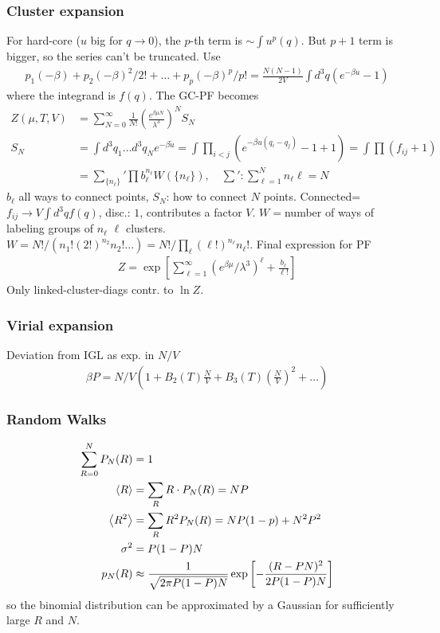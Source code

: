 \documentclass[a4paper, english, 12pt]{article}
\newcommand{\closed}[1]{\left( #1 \right)}
\newcommand{\bracket}[1]{\left[ #1 \right]}
\newcommand{\curly}[1]{\{ #1 \} }
\begin{document}
\begin{multicols*}{2}
\subsubsection*{\scriptsize Cluster expansion}
For hard-core ($u$ big for $q\to0$), the $p$-th term is $\sim \int u^p(q)$. But $p+1$ term is bigger, so the series can't be truncated. Use 
\begin{align*}
    p_1 (-\beta)  + p_2 (-\beta)^2 /2! + \dots + p_p (-\beta)^p /p! = \frac{N(N-1)}{2V} \int d^3 q (e^{-\beta u}-1)
\end{align*}
where the integrand is $f(q)$. The GC-PF becomes 
\begin{align*}
    Z(\mu,T,V) &= \sum_{N=0}^\infty \frac{1}{N!} \closed{\frac{e^{\beta\mu N}}{\lambda^3}}^N S_N \\ 
    S_N &=\int d^3 q_1 \dots d^3 q_N e^{-\beta \tilde{u}} = \int \prod_{i<j}\closed{e^{-\beta u(q_i-q_j)}-1+1} = \int \prod (f_{ij}+1) \\
    &= \sum_{\curly{n_\ell}}' \prod b_\ell^{n_\ell} W(\curly{n_\ell}),\quad \sum': \sum_{\ell=1}^N n_\ell \ell =N
\end{align*}
$b_\ell$ all ways to connect points, $S_N$: how to connect $N$ points. Connected=$f_{ij}\to V\int d^3 q f(q)$, disc.: $1$, contributes a factor $V$. $W=$number of ways of labeling groups of $n_\ell$ $\ell$ clusters. $W=N!/(n_1 ! (2!)^{n_2} n_2 ! ...)=N!/\prod_\ell (\ell!)^{n_\ell} n_\ell!$.
Final expression for PF 
\begin{align*}
    Z = \exp\bracket{\sum_{\ell=1}^\infty (e^{\beta\mu}/\lambda^3)^\ell + \frac{b_\ell}{\ell!} }
\end{align*}
Only linked-cluster-diags contr. to $\ln Z$.  


\subsubsection*{\scriptsize Virial expansion}
Deviation from IGL as exp. in $N/V$
\begin{align*}
    \beta P = N/V \closed{1 + B_2(T)\frac{N}{V} + B_3(T) \closed{\frac{N}{V}}^2 + \dots}
\end{align*}




\subsubsection*{\scriptsize Random Walks}

\begin{align*}
    \sum_{R=0}^N P_N(R) &= 1 \\ 
    \expval{R} &= \sum_R R\cdot P_N(R)=NP \\ 
    \expval{R^2} &= \sum_R R^2 P_N(R) = NP(1-p) + N^2 P^2 \\
    \sigma^2 &= P(1-P)N \\ 
    p_N(R) &\approx \frac{1}{\sqrt{2\pi P(1-P)N}}\exp\bracket{-\frac{(R-PN)^2}{2P(1-P)N}}
\end{align*}
so the binomial distribution can be approximated by a Gaussian for sufficiently large $R$ and $N$. 


\end{multicols*}
\end{document}
